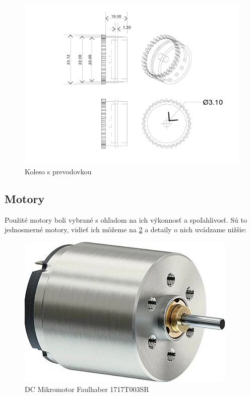 \begin{figure}[!htbp]
        \centering
        \includegraphics[scale=0.8]{includes/images/wheel_w_gear_2_blueprint.png}
        \caption{Koleso s prevodovkou}
        \label{fig:wheel_w_gear}
\end{figure}
\newpage
\subsection{Motory}
Použité motory boli vybrané s ohľadom na ich výkonnosť a spoľahlivosť. Sú to jednosmerné motory, vidieť ich môžeme na \ref{fig:motor} a detaily o nich uvádzame nižšie:

\begin{figure}[!htbp]
        \centering
        \includegraphics[scale=0.8]{includes/images/faulhaber.png}
        \caption{DC Mikromotor Faulhaber 1717T003SR}
        \label{fig:motor}
\end{figure}

